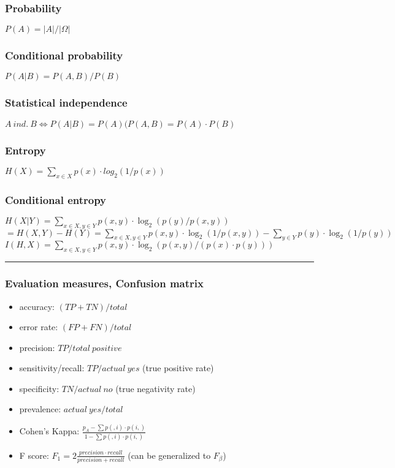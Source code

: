 \documentclass[a4paper]{article}
\begin{document}
\thispagestyle{fancy} %
{}

\subsubsection*{Probability}
$ P(A) = |A|/|\Omega| $
\subsubsection*{Conditional probability}
$ P(A|B) = P(A,B)/P(B) $
\subsubsection*{Statistical independence}
$ A\ ind.\ B \Leftrightarrow P(A|B) = P(A) (P(A,B) = P(A)\cdot P(B) $
\subsubsection*{Entropy}
$ H(X) = \sum_{x \in X} p(x) \cdot log_2(1/p(x)) $
\subsubsection*{Conditional entropy}
$ H(X|Y) = \sum_{x \in X, y \in Y} p(x, y) \cdot \log_2(p(y)/p(x,y)) $ \\
$ = H(X,Y) - H(Y) = \sum_{x \in X, y \in Y} p(x, y) \cdot \log_2(1/p(x,y)) - \sum_{y \in Y} p(y) \cdot \log_2(1/p(y))$ 
$ I(H,X) = \sum_{x \in X, y \in Y} p(x,y) \cdot \log_2(p(x,y)/(p(x)\cdot p(y))) $

\noindent\rule{\textwidth}{1pt}

\subsubsection*{Evaluation measures, Confusion matrix}
\begin{itemize}
\item accuracy: $(TP+TN)/total$
\item error rate: $(FP+FN)/total$
\item precision: $TP/total\ positive$
\item sensitivity/recall: $TP/actual\ yes$ (true positive rate)
\item specificity: $TN/actual\ no$ (true negativity rate)
\item prevalence: $actual\ yes/total$
\item Cohen's Kappa: $\frac{p_A-\sum p(,i)\cdot p(i,)}{1-\sum p(,i)\cdot p(i,)}$
\item F score: $F_1 = 2\frac{precision \cdot recall}{precision + recall}$ (can be generalized to $F_\beta$)
\end{itemize}
\end{document}
